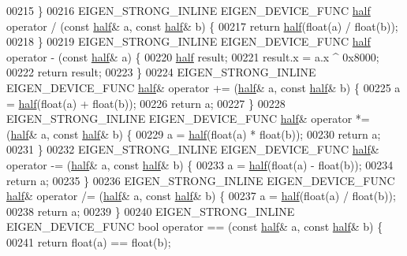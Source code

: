 \begin{DoxyCode}
00215 \}
00216 EIGEN\_STRONG\_INLINE EIGEN\_DEVICE\_FUNC \hyperlink{struct_eigen_1_1half}{half} operator / (\textcolor{keyword}{const} \hyperlink{struct_eigen_1_1half}{half}& a, \textcolor{keyword}{const} 
      \hyperlink{struct_eigen_1_1half}{half}& b) \{
00217   \textcolor{keywordflow}{return} \hyperlink{struct_eigen_1_1half}{half}(\textcolor{keywordtype}{float}(a) / \textcolor{keywordtype}{float}(b));
00218 \}
00219 EIGEN\_STRONG\_INLINE EIGEN\_DEVICE\_FUNC \hyperlink{struct_eigen_1_1half}{half} operator - (\textcolor{keyword}{const} \hyperlink{struct_eigen_1_1half}{half}& a) \{
00220   \hyperlink{struct_eigen_1_1half}{half} result;
00221   result.x = a.x ^ 0x8000;
00222   \textcolor{keywordflow}{return} result;
00223 \}
00224 EIGEN\_STRONG\_INLINE EIGEN\_DEVICE\_FUNC \hyperlink{struct_eigen_1_1half}{half}& operator += (\hyperlink{struct_eigen_1_1half}{half}& a, \textcolor{keyword}{const} 
      \hyperlink{struct_eigen_1_1half}{half}& b) \{
00225   a = \hyperlink{struct_eigen_1_1half}{half}(\textcolor{keywordtype}{float}(a) + \textcolor{keywordtype}{float}(b));
00226   \textcolor{keywordflow}{return} a;
00227 \}
00228 EIGEN\_STRONG\_INLINE EIGEN\_DEVICE\_FUNC \hyperlink{struct_eigen_1_1half}{half}& operator *= (\hyperlink{struct_eigen_1_1half}{half}& a, \textcolor{keyword}{const} 
      \hyperlink{struct_eigen_1_1half}{half}& b) \{
00229   a = \hyperlink{struct_eigen_1_1half}{half}(\textcolor{keywordtype}{float}(a) * \textcolor{keywordtype}{float}(b));
00230   \textcolor{keywordflow}{return} a;
00231 \}
00232 EIGEN\_STRONG\_INLINE EIGEN\_DEVICE\_FUNC \hyperlink{struct_eigen_1_1half}{half}& operator -= (\hyperlink{struct_eigen_1_1half}{half}& a, \textcolor{keyword}{const} 
      \hyperlink{struct_eigen_1_1half}{half}& b) \{
00233   a = \hyperlink{struct_eigen_1_1half}{half}(\textcolor{keywordtype}{float}(a) - \textcolor{keywordtype}{float}(b));
00234   \textcolor{keywordflow}{return} a;
00235 \}
00236 EIGEN\_STRONG\_INLINE EIGEN\_DEVICE\_FUNC \hyperlink{struct_eigen_1_1half}{half}& operator /= (\hyperlink{struct_eigen_1_1half}{half}& a, \textcolor{keyword}{const} 
      \hyperlink{struct_eigen_1_1half}{half}& b) \{
00237   a = \hyperlink{struct_eigen_1_1half}{half}(\textcolor{keywordtype}{float}(a) / \textcolor{keywordtype}{float}(b));
00238   \textcolor{keywordflow}{return} a;
00239 \}
00240 EIGEN\_STRONG\_INLINE EIGEN\_DEVICE\_FUNC \textcolor{keywordtype}{bool} operator == (\textcolor{keyword}{const} \hyperlink{struct_eigen_1_1half}{half}& a, \textcolor{keyword}{const} 
      \hyperlink{struct_eigen_1_1half}{half}& b) \{
00241   \textcolor{keywordflow}{return} float(a) == float(b);

\end{DoxyCode}
